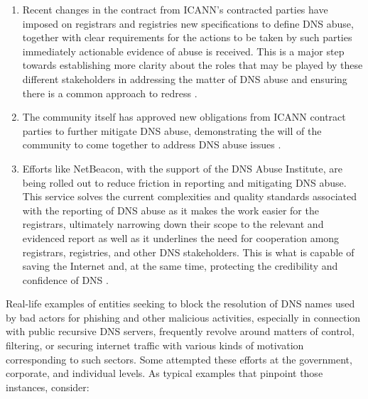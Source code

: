 \begin{enumerate}
  \item Recent changes in the contract from ICANN's contracted parties have imposed on registrars and registries new specifications to define DNS abuse, together with clear requirements for the actions to be taken by such parties immediately actionable evidence of abuse is received. This is a major step towards establishing more clarity about the roles that may be played by these different stakeholders in addressing the matter of DNS abuse and ensuring there is a common approach to redress \cite{Weinstein2023}.
  \item The community itself has approved new obligations from ICANN contract parties to further mitigate DNS abuse, demonstrating the will of the community to come together to address DNS abuse issues \cite{ICANN2023}.
  \item Efforts like NetBeacon, with the support of the DNS Abuse Institute, are being rolled out to reduce friction in reporting and mitigating DNS abuse. This service solves the current complexities and quality standards associated with the reporting of DNS abuse as it makes the work easier for the registrars, ultimately narrowing down their scope to the relevant and evidenced report as well as it underlines the need for cooperation among registrars, registries, and other DNS stakeholders. This is what is capable of saving the Internet and, at the same time, protecting the credibility and confidence of DNS \cite{NetBeacon}.
  
\end{enumerate}

Real-life examples of entities seeking to block the resolution of DNS names used by bad actors for phishing and other malicious activities, especially in connection with public recursive DNS servers, frequently revolve around matters of control, filtering, or securing internet traffic with various kinds of motivation corresponding to such sectors. Some attempted these efforts at the government, corporate, and individual levels. As typical examples that pinpoint those instances, consider:

